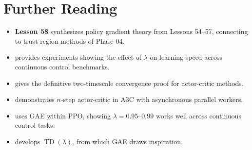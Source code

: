 \documentclass[11pt,a4paper]{article}
\begin{document}
\section{Further Reading}

\begin{itemize}
  \item \textbf{Lesson 58} synthesizes policy gradient theory from
    Lessons 54--57, connecting to trust-region methods of Phase 04.

  \item \citet{schulman2015} provides experiments showing the effect of
    $\lambda$ on learning speed across continuous control benchmarks.

  \item \citet{konda2003} gives the definitive two-timescale convergence
    proof for actor-critic methods.

  \item \citet{mnih2016} demonstrates $n$-step actor-critic in A3C
    with asynchronous parallel workers.

  \item \citet{schulman2017} uses GAE within PPO, showing $\lambda =
    0.95$--$0.99$ works well across continuous control tasks.

  \item \citet[Chapter 12]{suttonbarto2018} develops
    $\operatorname{TD}(\lambda)$, from which GAE draws inspiration.
\end{itemize}


\end{document}

